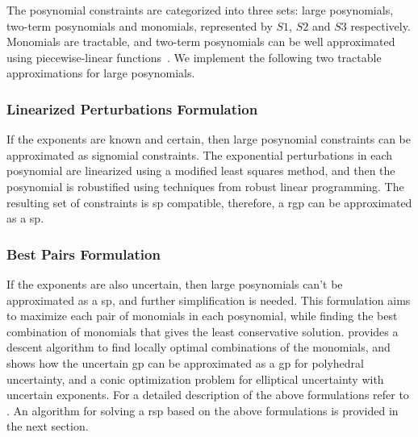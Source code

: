 The posynomial constraints are categorized into three sets: large posynomials, two-term posynomials and monomials,
represented by $S1$, $S2$ and $S3$ respectively.
Monomials are tractable, and two-term posynomials can be well approximated using piecewise-linear
functions~\cite{Hsiung2008}.
We implement the following two tractable approximations for large posynomials.

\subsubsection{Linearized Perturbations Formulation}
If the exponents are known and certain, then large posynomial constraints can be approximated as signomial constraints.
The exponential perturbations in each posynomial are linearized using a modified least squares method, and then the
posynomial is robustified using techniques from robust linear programming. The resulting set of constraints is \gls{sp} compatible,
therefore, a \gls{rgp} can be approximated as a \gls{sp}.

\subsubsection{Best Pairs Formulation}
If the exponents are also uncertain, then large posynomials can't be approximated as a \gls{sp}, and further simplification is needed.
This formulation aims to maximize each pair of monomials in each posynomial,
while finding the best combination of monomials that gives the least conservative solution.
\cite{Saab2018} provides a descent algorithm to find locally optimal combinations of the monomials,
and shows how the uncertain \gls{gp} can be approximated as a \gls{gp} for polyhedral uncertainty,
and a conic optimization problem for elliptical uncertainty with uncertain exponents.
For a detailed description of the above formulations refer to \cite{Saab2018}.
An algorithm for solving a \gls{rsp} based on the above formulations is provided in the next section.
